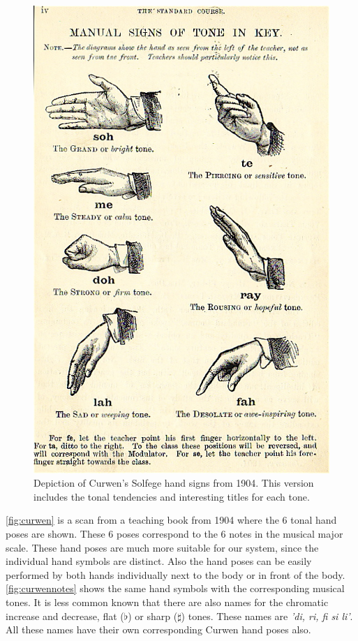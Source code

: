 \begin{figure}[htbp]
	\centering{}
	\includegraphics[width=0.6\linewidth]{figures/curwen.jpg}
	\caption{Depiction of Curwen's Solfege hand signs from 1904. This version includes the tonal tendencies and interesting titles for each tone.}
	\label{fig:curwen}
\end{figure}

\autoref{fig:curwen} is a scan from a teaching book from 1904 where the 6 tonal hand poses are shown. These 6 poses correspond to the 6 notes in the musical major scale. These hand poses are much more suitable for our system, since the individual hand symbols are distinct. Also the hand poses can be easily performed by both hands individually next to the body or in front of the body. \autoref{fig:curwennotes} shows the same hand symbols with the corresponding musical tones. It is less common known that there are also names for the chromatic increase and decrease, flat ($\flat$) or sharp ($\sharp$) tones. These names are \emph{'di, ri, fi si li'}. All these names have their own corresponding Curwen hand poses also.


